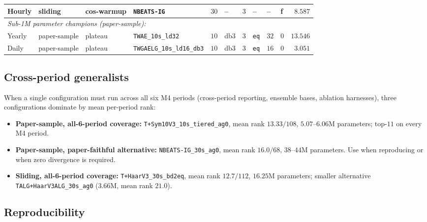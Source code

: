 \documentclass[11pt,a4paper]{article}
\begin{document}
\begin{table}[h]
\begin{tabular}{@{}llllllllllr@{}}
Hourly    & sliding      & cos-warmup & \texttt{NBEATS-IG}                  & $30$ & --    & $3$ & --             & --   & f & $\phantom{0}8.587$ \\
\midrule
\multicolumn{11}{l}{\textit{Sub-1M parameter champions (paper-sample):}} \\
Yearly    & paper-sample & plateau & \texttt{TWAE\_10s\_ld32}             & $10$ & db3   & $3$ & \texttt{eq} & $32$ & 0 & $13.546$ \\
Daily     & paper-sample & plateau & \texttt{TWGAELG\_10s\_ld16\_db3}     & $10$ & db3   & $3$ & \texttt{eq} & $16$ & 0 & $\phantom{0}3.051$ \\
\bottomrule
\end{tabular}
\end{table}

\subsection{Cross-period generalists}
\label{app:hyperparams:generalist}

When a single configuration must run across all six M4 periods (cross-period reporting, ensemble bases, ablation harnesses), three configurations dominate by mean per-period rank:

\begin{itemize}\itemsep -1pt
\item \textbf{Paper-sample, all-6-period coverage:} \texttt{T+Sym10V3\_10s\_tiered\_ag0}, mean rank $13.33/108$, $5.07$--$6.06$M parameters; top-$11$ on every M4 period.
\item \textbf{Paper-sample, paper-faithful alternative:} \texttt{NBEATS-IG\_30s\_ag0}, mean rank $16.0/68$, $38$--$44$M parameters. Use when reproducing \citet{oreshkin2020nbeats} or when zero divergence is required.
\item \textbf{Sliding, all-6-period coverage:} \texttt{T+HaarV3\_30s\_bd2eq}, mean rank $12.7/112$, $16.25$M parameters; smaller alternative \texttt{TALG+HaarV3ALG\_30s\_ag0} ($3.66$M, mean rank $21.0$).
\end{itemize}

\subsection{Reproducibility}
\label{app:hyperparams:repro}
\end{document}
